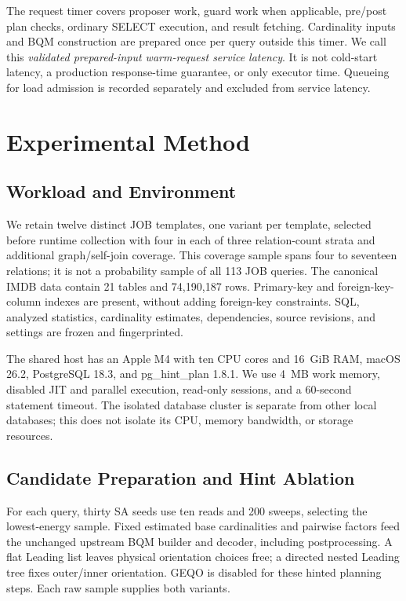 \documentclass[conference]{IEEEtran}
\begin{document}
The request timer covers proposer work, guard work when applicable, pre/post plan
checks, ordinary SELECT execution, and result fetching. Cardinality inputs and
BQM construction are prepared once per query outside this timer. We call this
\emph{validated prepared-input warm-request service latency}. It is not cold-start
latency, a production response-time guarantee, or only executor time. Queueing
for load admission is recorded separately and excluded from service latency.

\section{Experimental Method}
\subsection{Workload and Environment}
We retain twelve distinct JOB templates, one variant per template, selected
before runtime collection with four in each of three relation-count strata and
additional graph/self-join coverage. This coverage sample spans four to seventeen
relations; it is not a probability sample of all 113 JOB queries. The canonical
IMDB data contain 21 tables and 74,190,187 rows. Primary-key and foreign-key-column
indexes are present, without adding foreign-key constraints. SQL, analyzed
statistics, cardinality estimates, dependencies, source revisions, and settings
are frozen and fingerprinted.

The shared host has an Apple M4 with ten CPU cores and 16~GiB RAM, macOS 26.2,
PostgreSQL 18.3, and pg\_hint\_plan 1.8.1. We use 4~MB work memory, disabled JIT
and parallel execution, read-only sessions, and a 60-second statement timeout.
The isolated database cluster is separate from other local databases; this does
not isolate its CPU, memory bandwidth, or storage resources.

\subsection{Candidate Preparation and Hint Ablation}
For each query, thirty SA seeds use ten reads and 200 sweeps, selecting the
lowest-energy sample. Fixed estimated base cardinalities and pairwise factors
feed the unchanged upstream BQM builder and decoder, including postprocessing.
A flat Leading list leaves physical orientation choices free; a directed nested
Leading tree fixes outer/inner orientation. GEQO is disabled for these hinted
planning steps. Each raw sample supplies both variants.
\end{document}
